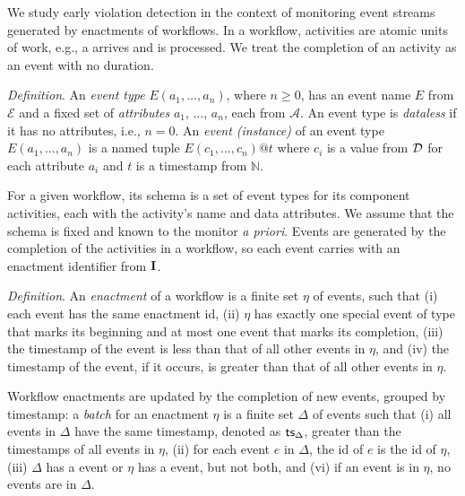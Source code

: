 We study early violation detection
in the context of monitoring
event streams generated by enactments of workflows.
In a workflow, activities are atomic units of work,
e.g., a {\Request} arrives and is processed.
We treat the completion of an activity
as an event with no duration.

{\it Definition}.
An {\em event type} $E(a_1,\dots,a_n)$, 
where $n\geq 0$,
has an event name $E$ from $\mathcal{E}$
and a fixed set of {\em attributes} $a_1$, $\dots$, $a_n$, each from $\mathcal{A}$.
An event type is {\em dataless} if it has no attributes, i.e., $n=0$.
An {\em event (instance)} of an event type $E(a_1,...,a_n)$
is a named tuple $E(c_1,...,c_n)@t$ where
$c_i$ is a value from $\mathcal{D}$
for each attribute $a_i$
and $t$ is a timestamp from $\mathbb{N}$.

For a given workflow,
its schema is a set of event types
for its component activities,
each with the activity's name and data attributes.
We assume that the schema is fixed
and known to the monitor {\em a priori}.
Events are generated by the completion of the activities in a workflow,
so each event carries with an enactment identifier from $\textbf{I}$.

{\it Definition}.
An {\em enactment} of a workflow
is a finite set $\eta$ of events,
such that
(i) each event has the same enactment {\sc id},
(ii) $\eta$ has exactly one special event of type {\Start}
that marks its beginning
and at most one {\End} event
that marks its completion,
(iii)
the timestamp of the {\Start} event is
less than that of all other events in $\eta$, and
(iv)
the timestamp of the {\End} event, if it occurs,
is greater than that of all other events in $\eta$.

Workflow enactments
are updated by the completion of new events,
grouped by timestamp:
a {\em batch} for an enactment $\eta$
is a finite set $\Delta$ of events such that
(i) all events in $\Delta$ have the same timestamp,
denoted as $\textsf{ts}_\Delta$,
greater than the timestamps of all events in $\eta$,
(ii) for each event $e$ in $\Delta$,
the {\sc id} of $e$ is the {\sc id} of $\eta$,
(iii) $\Delta$ has a {\Start} event or $\eta$ has a {\Start} event,
but not both, and
(vi) if an {\End} event is in $\eta$,
no events are in $\Delta$.


